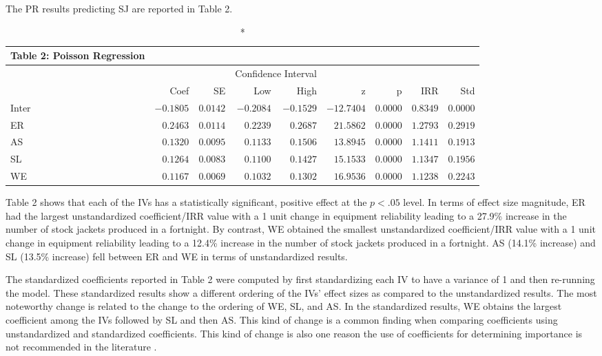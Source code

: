 \documentclass[ShortAfour,times,sageapa]{sagej}
\begin{document}
	The PR results predicting SJ are reported in Table 2. 
	
	\begin{longtable}{l|rrrrrrrr}
		\caption*{
			{\large Table 2: Poisson Regression}
		} \\ 
		\toprule
		\multicolumn{1}{l}{} &  &  & \multicolumn{2}{c}{Confidence Interval} &  &  &  &  \\ 
		\cmidrule(lr){4-5}
		\multicolumn{1}{l}{} & Coef & SE & Low & High & z & p & IRR & Std \\ 
		\midrule
		Inter & $-0.1805$ & $0.0142$ & $-0.2084$ & $-0.1529$ & $-12.7404$ & $0.0000$ & $0.8349$ & $0.0000$ \\ 
		ER & $0.2463$ & $0.0114$ & $0.2239$ & $0.2687$ & $21.5862$ & $0.0000$ & $1.2793$ & $0.2919$ \\ 
		AS & $0.1320$ & $0.0095$ & $0.1133$ & $0.1506$ & $13.8945$ & $0.0000$ & $1.1411$ & $0.1913$ \\ 
		SL & $0.1264$ & $0.0083$ & $0.1100$ & $0.1427$ & $15.1533$ & $0.0000$ & $1.1347$ & $0.1956$ \\ 
		WE & $0.1167$ & $0.0069$ & $0.1032$ & $0.1302$ & $16.9536$ & $0.0000$ & $1.1238$ & $0.2243$ \\ 
		\bottomrule
	\end{longtable}

	Table 2 shows that each of the IVs has a statistically significant, positive effect at the $p < .05$ level.	
	In terms of effect size magnitude, ER had the largest unstandardized coefficient/IRR value with a 1 unit change in equipment reliability leading to a 27.9\% increase in the number of stock jackets produced in a fortnight.
	By contrast, WE obtained the smallest unstandardized coefficient/IRR value with a 1 unit change in equipment reliability leading to a 12.4\% increase in the number of stock jackets produced in a fortnight. 
	AS (14.1\% increase) and SL (13.5\% increase) fell between ER and WE in terms of unstandardized results.
	
	The standardized coefficients reported in Table 2 were computed by first standardizing each IV to have a variance of 1 and then re-running the model.
	These standardized results show a different ordering of the IVs' effect sizes as compared to the unstandardized results. 
	The most noteworthy change is related to the change to the ordering of WE, SL, and AS. In the standardized results, WE obtains the largest coefficient among the IVs followed by SL and then AS. 
	This kind of change is a common finding when comparing coefficients using unstandardized and standardized coefficients.
	This kind of change is also one reason the use of coefficients for determining importance is not recommended in the literature \cite{johnson2004history}.
	
\end{document}
